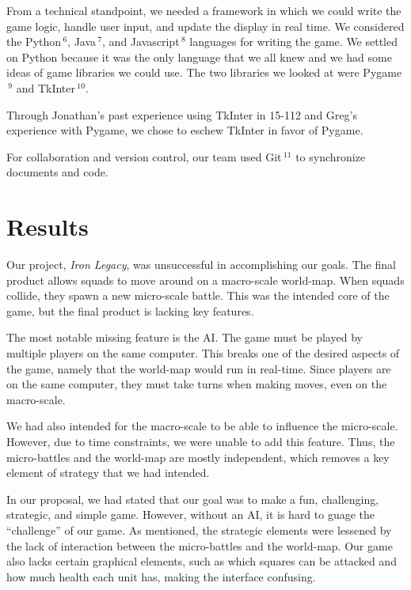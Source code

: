 \documentclass{article}
\begin{document}
From a technical standpoint, we needed a framework in which we could write the
game logic, handle user input, and update the display in real time.
We considered the Python$\,^6$, Java$\,^7$, and 
Javascript$\,^8$ languages for writing the game. 
We settled on Python because it was the only language that we all knew
and we had some ideas of game libraries we could use.
The two libraries we looked at were Pygame$\,^9$ and TkInter$\,^{10}$.

Through Jonathan's past experience using TkInter in 15-112 and Greg's 
experience with Pygame, we chose to eschew TkInter in favor of Pygame.

For collaboration and version control, our team used Git$\,^{11}$ to
synchronize documents and code.

\section*{Results}

Our project, \emph{Iron Legacy}, was unsuccessful in accomplishing
    our goals.
    The final product allows squads to move around on a macro-scale world-map.
    When squads collide, they spawn a new micro-scale battle.
    This was the intended core of the game, but the final product is lacking
    key features.

The most notable missing feature is the AI.
    The game must be played by multiple players on the same computer.
    This breaks one of the desired aspects of the game,
    namely that the world-map would run in real-time.
    Since players are on the same computer, they must take turns when making
    moves, even on the macro-scale.

We had also intended for the macro-scale to be able to influence the
    micro-scale.
    However, due to time constraints, we were unable to add this feature.
    Thus, the micro-battles and the world-map are mostly independent,
    which removes a key element of strategy that we had intended.

In our proposal, we had stated that our goal was to make a fun, challenging,
    strategic, and simple game.
    However, without an AI, it is hard to guage the ``challenge'' of our game.
    As mentioned, the strategic elements were lessened by the lack of
    interaction between the micro-battles and the world-map.
    Our game also lacks certain graphical elements, such as which squares
    can be attacked and how much health each unit has, making the interface
    confusing.
\end{document}
